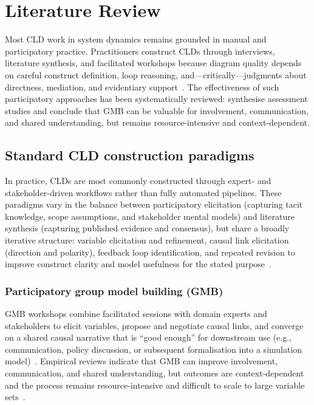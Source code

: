 \chapter{Literature Review}
\label{sec:literature_review}

Most CLD work in system dynamics remains grounded in manual and participatory practice. Practitioners construct CLDs through interviews, literature synthesis, and facilitated workshops because diagram quality depends on careful construct definition, loop reasoning, and---critically---judgments about directness, mediation, and evidentiary support~\citep{richardson1986problemscld,sterman2002system,vennix1996gmb,crielaard2024refining}. The effectiveness of such participatory approaches has been systematically reviewed: \citet{rouwette2002gmb_effectiveness} synthesise assessment studies and conclude that GMB can be valuable for involvement, communication, and shared understanding, but remains resource-intensive and context-dependent.

\medskip
\section{Standard CLD construction paradigms}
\label{sec:lit_standard_cld_paradigms}

In practice, CLDs are most commonly constructed through expert- and stakeholder-driven workflows rather than fully automated pipelines. These paradigms vary in the balance between participatory elicitation (capturing tacit knowledge, scope assumptions, and stakeholder mental models) and literature synthesis (capturing published evidence and consensus), but share a broadly iterative structure: variable elicitation and refinement, causal link elicitation (direction and polarity), feedback loop identification, and repeated revision to improve construct clarity and model usefulness for the stated purpose~\citep{sterman2002system,vennix1996gmb,richardson1986problemscld}.

\subsection{Participatory group model building (GMB)}
GMB workshops combine facilitated sessions with domain experts and stakeholders to elicit variables, propose and negotiate causal links, and converge on a shared causal narrative that is ``good enough'' for downstream use (e.g., communication, policy discussion, or subsequent formalisation into a simulation model)~\citep{vennix1996gmb,sterman2002system}. Empirical reviews indicate that GMB can improve involvement, communication, and shared understanding, but outcomes are context-dependent and the process remains resource-intensive and difficult to scale to large variable sets~\citep{rouwette2002gmb_effectiveness}.


